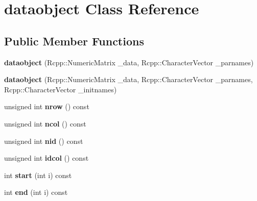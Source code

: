 \hypertarget{classdataobject}{}\section{dataobject Class Reference}
\label{classdataobject}
\subsection*{Public Member Functions}
\begin{DoxyCompactItemize}
\item 
\mbox{\label{classdataobject_a8483694418e230966e74064186c0bfc4}} 
{\bfseries dataobject} (Rcpp\+::\+Numeric\+Matrix \+\_\+data, Rcpp\+::\+Character\+Vector \+\_\+parnames)
\item 
\mbox{\label{classdataobject_a14d3df0ff6242472550384bee0b57e98}} 
{\bfseries dataobject} (Rcpp\+::\+Numeric\+Matrix \+\_\+data, Rcpp\+::\+Character\+Vector \+\_\+parnames, Rcpp\+::\+Character\+Vector \+\_\+initnames)
\item 
\mbox{\label{classdataobject_a1e71ba1792a9fadbb4b4e0bf67cff101}} 
unsigned int {\bfseries nrow} () const
\item 
\mbox{\label{classdataobject_a8843b2e1b23ee5fe8f40202671ee75ee}} 
unsigned int {\bfseries ncol} () const
\item 
\mbox{\label{classdataobject_a83a26760357ced3f938a1dbf29deece9}} 
unsigned int {\bfseries nid} () const
\item 
\mbox{\label{classdataobject_acaa39a0aac83ba62d13a738ca2a473a8}} 
unsigned int {\bfseries idcol} () const
\item 
\mbox{\label{classdataobject_ac242bbaaf29ec6a93b549f4f649be568}} 
int {\bfseries start} (int i) const
\item 
\mbox{\label{classdataobject_acaf7ee8b42108834b3b8c166f8964f64}} 
int {\bfseries end} (int i) const
\item 
\mbox{\label{classdataobject_ac9041a7122585160b536b82da0bed094}} 

\end{DoxyCompactItemize}
